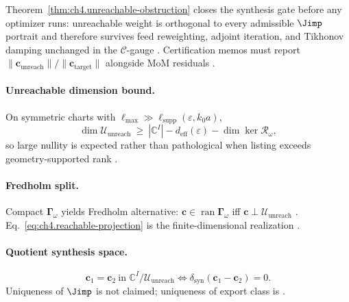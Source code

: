 Theorem~\ref{thm:ch4.unreachable-obstruction} closes the synthesis gate before any optimizer runs: unreachable weight is orthogonal to every admissible
\(\Jimp\) portrait and therefore survives feed reweighting, adjoint iteration, and Tikhonov damping unchanged in the \(\mathcal{C}\)-gauge
\cite{stratton1941,harrington2001,devaney2004}. Certification memos must report \(\|\mathbf{c}_{\mathrm{unreach}}\|/\|\mathbf{c}_{\mathrm{target}}\|\)
alongside MoM residuals \cite{hansen1988}.

\paragraph{Unreachable dimension bound.}
On symmetric charts with \(\ell_{\max}\gg\ell_{\mathrm{supp}}(\varepsilon,k_{0}a)\),
\begin{equation}
\label{eq:ch4.unreach-dim-bound}
\dim\mathcal{U}_{\mathrm{unreach}}\ \ge\ |\mathbb{C}^{I}|-d_{\mathrm{eff}}(\varepsilon)-\dim\ker\mathcal{R}_\omega,
\end{equation}
so large nullity is expected rather than pathological when listing exceeds geometry-supported rank \cite{hansen1988,harrington2001,stratton1941,devaney2004}.

\paragraph{Fredholm split.}
Compact \(\boldsymbol{\Gamma}_\omega\) yields Fredholm alternative: \(\mathbf{c}\in\operatorname{ran}\boldsymbol{\Gamma}_\omega\) iff
\(\mathbf{c}\perp\mathcal{U}_{\mathrm{unreach}}\) \cite{harrington2001,stratton1941}. Eq.~\eqref{eq:ch4.reachable-projection} is the finite-dimensional
realization \cite{devaney2004}.

\paragraph{Quotient synthesis space.}
\begin{equation}
\label{eq:ch4.quotient-synthesis}
\mathbf{c}_{1}=\mathbf{c}_{2}\ \text{in }\mathbb{C}^{I}/\mathcal{U}_{\mathrm{unreach}}
\iff
\delta_{\mathrm{syn}}(\mathbf{c}_{1}-\mathbf{c}_{2})=0.
\end{equation}
Uniqueness of \(\Jimp\) is not claimed; uniqueness of export class is \cite{harrington2001,stratton1941}.

